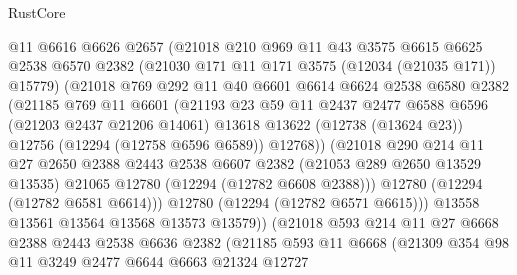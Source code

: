 \begin{lexlean}{RustCore}
\begin{coremodule}
                @11
                @6616
                @6626
                @2657
                (@21018
                  @210
                  @969
                  @11
                  @43
                  @3575
                  @6615
                  @6625
                  @2538
                  @6570
                  @2382
                  (@21030 @171 @11 @171 @3575 (@12034 (@21035 @171)) @15779)
                  (@21018
                    @769
                    @292
                    @11
                    @40
                    @6601
                    @6614
                    @6624
                    @2538
                    @6580
                    @2382
                    (@21185
                      @769
                      @11
                      @6601
                      (@21193
                        @23
                        @59
                        @11
                        @2437
                        @2477
                        @6588
                        @6596
                        (@21203 @2437 @21206 @14061)
                        @13618
                        @13622
                        (@12738 (@13624 @23))
                        @12756
                        (@12294 (@12758 @6596 @6589))
                        @12768))
                    (@21018
                      @290
                      @214
                      @11
                      @27
                      @2650
                      @2388
                      @2443
                      @2538
                      @6607
                      @2382
                      (@21053 @289 @2650 @13529 @13535)
                      @21065
                      @12780
                      (@12294 (@12782 @6608 @2388)))
                    @12780
                    (@12294 (@12782 @6581 @6614)))
                  @12780
                  (@12294 (@12782 @6571 @6615)))
                @13558
                @13561
                @13564
                @13568
                @13573
                @13579))
            (@21018
              @593
              @214
              @11
              @27
              @6668
              @2388
              @2443
              @2538
              @6636
              @2382
              (@21185
                @593
                @11
                @6668
                (@21309
                  @354
                  @98
                  @11
                  @3249
                  @2477
                  @6644
                  @6663
                  @21324
                  @12727

\end{coremodule}
\end{lexlean}
